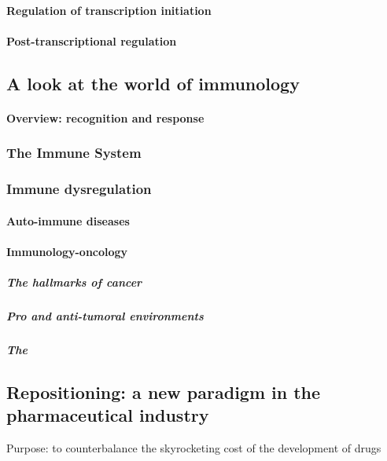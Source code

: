 \paragraph{Regulation of transcription initiation}

\paragraph{Post-transcriptional regulation}

\subsection{A look at the world of immunology}


\paragraph{Overview: recognition and response}

\subsubsection{The Immune System}
\subsubsection{Immune dysregulation}

\paragraph{Auto-immune diseases}

\paragraph{Immunology-oncology}
\subparagraph{The hallmarks of cancer}

\subparagraph{Pro and anti-tumoral environments}
\subparagraph{The }

\subsection{Repositioning: a new paradigm in the pharmaceutical industry}


Purpose: to counterbalance the skyrocketing cost of the development of drugs

